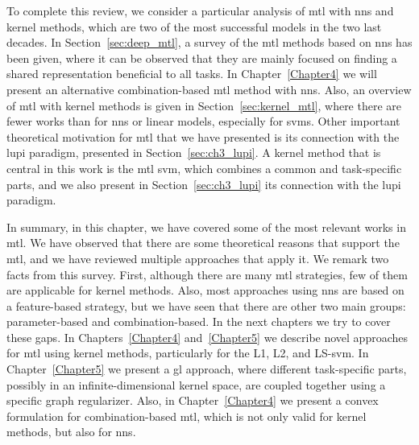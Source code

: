 To complete this review, we consider a particular analysis of \acrshort{mtl} with \acrshort{nns} and kernel methods, which are two of the most successful models in the two last decades.
In Section~\ref{sec:deep_mtl}, a survey of the \acrshort{mtl} methods based on \acrshort{nns} has been given, where it can be observed that they are mainly focused on finding a shared representation beneficial to all tasks. In Chapter~\ref{Chapter4} we will present an alternative combination-based \acrshort{mtl} method with \acrshort{nns}.
Also, an overview of \acrshort{mtl} with kernel methods is given in Section~\ref{sec:kernel_mtl}, where there are fewer works than for \acrshort{nns} or linear models, especially for \acrshort{svms}. 
Other important theoretical motivation for \acrshort{mtl} that we have presented is its connection with the \acrshort{lupi} paradigm, presented in Section~\ref{sec:ch3_lupi}.
%
A kernel method that is central in this work is the \acrshort{mtl} \acrshort{svm}, which combines a common and task-specific parts, and we also present in Section~\ref{sec:ch3_lupi} its connection with the \acrshort{lupi} paradigm.
%

In summary, in this chapter, we have covered some of the most relevant works in \acrshort{mtl}. We have observed that there are some theoretical reasons that support the \acrshort{mtl}, and we have reviewed multiple approaches that apply it. 
We remark two facts from this survey. First, although there are many \acrshort{mtl} strategies, few of them are applicable for kernel methods. Also, most approaches using \acrshort{nns} are based on a feature-based strategy, but we have seen that there are other two main groups: parameter-based and combination-based.
%
In the next chapters we try to cover these gaps. In Chapters~\ref{Chapter4} and~\ref{Chapter5} we describe novel approaches for \acrshort{mtl} using kernel methods, particularly for the L1, L2, and LS-\acrshort{svm}.
%
In Chapter~\ref{Chapter5} we present a \acrshort{gl} approach, where different task-specific parts, possibly in an infinite-dimensional kernel space, are coupled together using a specific graph regularizer.
%
Also, in Chapter~\ref{Chapter4} we present a convex formulation for combination-based \acrshort{mtl}, which is not only valid for kernel methods, but also for \acrshort{nns}.

